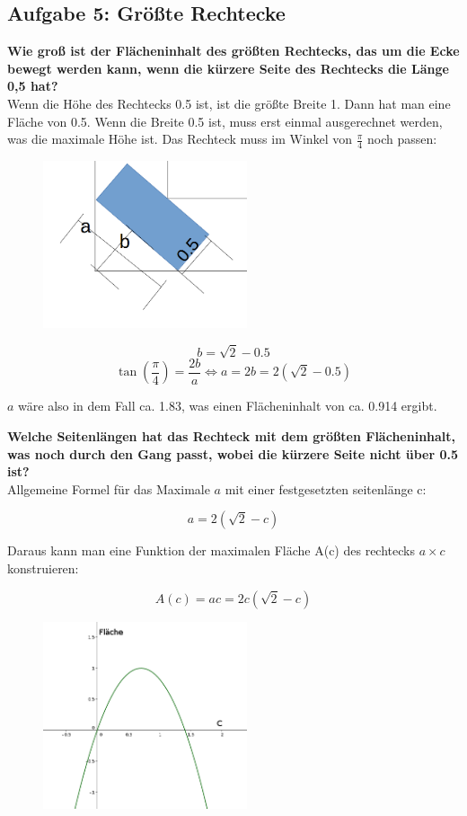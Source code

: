\documentclass[a4paper,11pt]{article}
\begin{document}
\subsection{Aufgabe 5: Gr\"o\ss te Rechtecke}

\textbf{Wie groß ist der Flächeninhalt des größten Rechtecks, das um die Ecke bewegt werden kann,
wenn die kürzere Seite des Rechtecks die Länge 0,5 hat?} \\
Wenn die H\"ohe des Rechtecks 0.5 ist, ist die gr\"o\ss te Breite 1. Dann hat man eine Fl\"ache von 0.5.
Wenn die Breite 0.5 ist, muss erst einmal ausgerechnet werden, was die maximale H\"ohe ist. Das Rechteck muss im Winkel von $\frac{\pi}{4}$ noch passen: 

\begin{figure}[htbp] 
        \centering
        \includegraphics[width=6cm]{img/A5_1.png}
\end{figure}

\[ b = \sqrt{2} - 0.5 \]
\[ \tan(\frac{\pi}{4}) = \frac{2b}{a} \Leftrightarrow  a = 2b  = 2(\sqrt{2}-0.5)  \]

$a$ w\"are also in dem Fall ca. 1.83, was einen Fl\"acheninhalt von ca. 0.914 ergibt.

\textbf{Welche Seitenl\"angen hat das Rechteck mit dem gr\"o\ss ten Fl\"acheninhalt, was noch durch den Gang passt, wobei die k\"urzere Seite nicht \"uber 0.5 ist?} \\
Allgemeine Formel f\"ur das Maximale $a$ mit einer festgesetzten seitenl\"ange c:

\[ a = 2(\sqrt{2}-c) \]

Daraus kann man eine Funktion der maximalen Fl\"ache A(c) des rechtecks $a \times c$ konstruieren:

\[ A(c) = a c = 2c(\sqrt{2}-c) \]

\begin{figure}[htbp] 
        \centering
        \includegraphics[width=6cm]{img/A5_2.png}
\end{figure}
\end{document}
